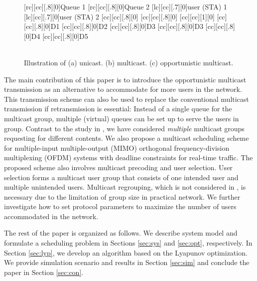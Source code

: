\documentclass[conference]{IEEEtran}
\newcommand{\0}{\vect{0}}
\newcommand{\1}{\vect{1}}
\begin{document}
\begin{figure}[!t]
\begin{center}
[rc][cc][.8][0]{\sf Queue 1}
[rc][cc][.8][0]{\sf Queue 2}
[lc][cc][.7][0]{\sf user (STA) 1}
[lc][cc][.7][0]{\sf user (STA) 2}
[cc][cc][.8][0]{\sf }
[cc][cc][.8][0]{\sf }
[cc][cc][1][0]{\sf }
[cc][cc][.8][0]{\sf D1}
[cc][cc][.8][0]{\sf D2}
[cc][cc][.8][0]{\sf D3}
[cc][cc][.8][0]{\sf D3}
[cc][cc][.8][0]{\sf D4}
[cc][cc][.8][0]{\sf D5}
\\
\\
\caption{Illustration of (a) unicast. (b) multicast. (c) opportunistic multicast.}
\label{fig:f0}
\end{center}
\end{figure}





The main contribution of this paper is to introduce the opportunistic multicast transmission as an alternative to accommodate for more users in the network. This transmission scheme can also be used to replace the conventional multicast transmission if retransmission is essential: Instead of a single queue for the multicast group, multiple (virtual) queues can be set up to serve the users in group. Contrast to the study in \cite{Won09WC,Low10WC,Tsa11WC}, we have considered {\it multiple} multicast groups requesting for different contents. We also propose a multicast scheduling scheme for multiple-input multiple-output (MIMO) orthogonal frequency-division multiplexing (OFDM) systems with deadline constraints for real-time traffic. The proposed scheme also involves multicast precoding and user selection. User selection forms a multicast user group that consists of one intended user and multiple unintended users. Multicast regrouping, which is not considered in \cite{Won09WC}, is necessary due to the limitation of group size in practical network. We further investigate how to set protocol parameters to maximize the number of users accommodated in the network.


The rest of the paper is organized as follows. We describe system model and formulate a scheduling problem in Sections \ref{sec:sys} and \ref{sec:opt}, respectively. In Section \ref{sec:lyp}, we develop an algorithm based on the Lyapunov optimization. We provide simulation scenario and results in Section \ref{sec:sim} and conclude the paper in Section \ref{sec:con}.
\end{document}
